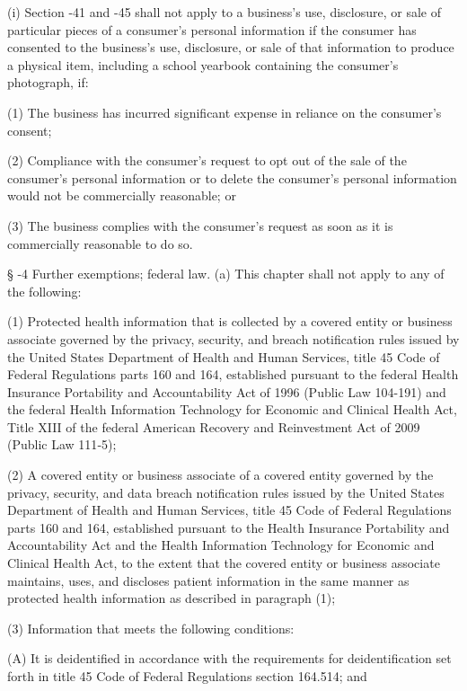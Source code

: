      (i)  Section    -41 and    -45 shall not apply to a business's use, disclosure, or sale of particular pieces of a consumer's personal information if the consumer has consented to the business's use, disclosure, or sale of that information to produce a physical item, including a school yearbook containing the consumer's photograph, if:

     (1)  The business has incurred significant expense in reliance on the consumer's consent;

     (2)  Compliance with the consumer's request to opt out of the sale of the consumer's personal information or to delete the consumer's personal information would not be commercially reasonable; or

     (3)  The business complies with the consumer's request as soon as it is commercially reasonable to do so.

     §   -4  Further exemptions; federal law.  (a)  This chapter shall not apply to any of the following:

     (1)  Protected health information that is collected by a covered entity or business associate governed by the privacy, security, and breach notification rules issued by the United States Department of Health and Human Services, title 45 Code of Federal Regulations parts 160 and 164, established pursuant to the federal Health Insurance Portability and Accountability Act of 1996 (Public Law 104-191) and the federal Health Information Technology for Economic and Clinical Health Act, Title XIII of the federal American Recovery and Reinvestment Act of 2009 (Public Law 111‑5);

     (2)  A covered entity or business associate of a covered entity governed by the privacy, security, and data breach notification rules issued by the United States Department of Health and Human Services, title 45 Code of Federal Regulations parts 160 and 164, established pursuant to the Health Insurance Portability and Accountability Act and the Health Information Technology for Economic and Clinical Health Act, to the extent that the covered entity or business associate maintains, uses, and discloses patient information in the same manner as protected health information as described in paragraph (1);

     (3)  Information that meets the following conditions:

          (A)  It is deidentified in accordance with the requirements for deidentification set forth in title 45 Code of Federal Regulations section 164.514; and

